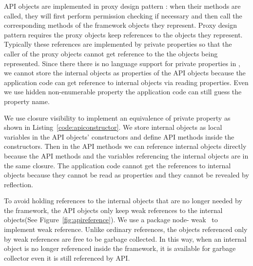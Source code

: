 API objects are implemented in proxy design pattern :  when their methods are
called, they will first perform permission checking if necessary and then call
the corresponding methods of the framework objects they represent. Proxy
design pattern requires the proxy objects keep references to the objects they
represent. Typically these references are implemented by private properties so
that  the caller of the proxy objects cannot get reference to the the objects
being represented. Since there there is no language support for private
properties in \js, we cannot  store the internal objects as properties of the
API objects because the  application code can get reference to internal
objects via reading properties. Even we use  hidden non-enumerable property
the application code can still guess the property name.

We use closure visibility to implement an equivalence of private property as
shown in Listing~\ref{code:apiconstructor}. We store internal objects as local
variables in the API objects' constructors and define API methods inside the
constructors. Then in the API methods we can reference internal objects
directly because the API methods and the variables referencing the internal
objects are in the same closure. The application code cannot get the
references to internal objects because they cannot be read as properties and they
cannot be revealed by reflection.



To avoid holding references to the internal objects that are no longer needed
by the framework, the API objects only keep weak references to the internal
objects(See Figure~\ref{fig:apireference}). We use a \nodejs{} package node-
weak~\cite{nodeweak} to implement weak reference. Unlike ordinary references,
the objects referenced only by weak references are free to be garbage
collected.
In this way, when an internal object is no longer referenced
inside the framework, it is available for garbage collector even it is still
referenced by API.


